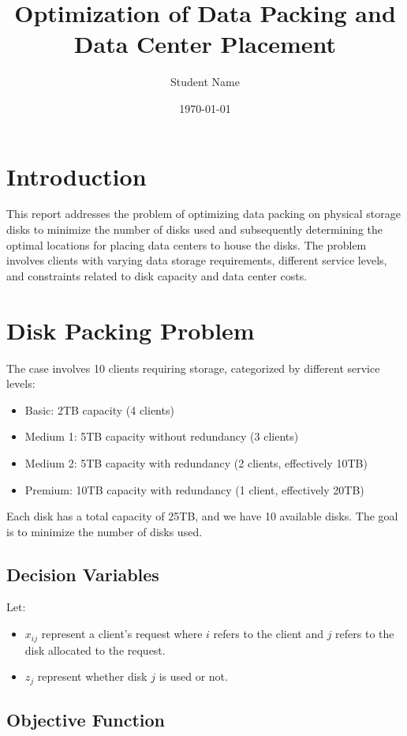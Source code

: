 \documentclass{article}
\title{Optimization of Data Packing and Data Center Placement}
\author{Student Name}
\date{\today}
\begin{document}
\maketitle

\section{Introduction}

This report addresses the problem of optimizing data packing on physical storage disks to minimize the number of disks used and subsequently determining the optimal locations for placing data centers to house the disks. The problem involves clients with varying data storage requirements, different service levels, and constraints related to disk capacity and data center costs.

\section{Disk Packing Problem}

The case involves 10 clients requiring storage, categorized by different service levels:
\begin{itemize}
    \item Basic: 2TB capacity (4 clients)
    \item Medium 1: 5TB capacity without redundancy (3 clients)
    \item Medium 2: 5TB capacity with redundancy (2 clients, effectively 10TB)
    \item Premium: 10TB capacity with redundancy (1 client, effectively 20TB)
\end{itemize}

Each disk has a total capacity of 25TB, and we have 10 available disks. The goal is to minimize the number of disks used.

\subsection{Decision Variables}

Let:
\begin{itemize}
    \item $x_{ij}$ represent a client’s request where $i$ refers to the client and $j$ refers to the disk allocated to the request.
    \item $z_j$ represent whether disk $j$ is used or not.
\end{itemize}

\subsection{Objective Function}
\end{document}
